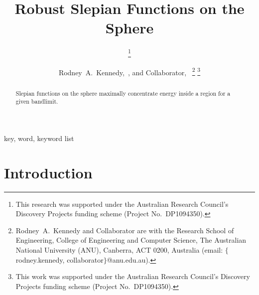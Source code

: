 \documentclass[10pt, twocolumn, twoside]{IEEEtran}
\begin{document}
\title{Robust Slepian Functions on the Sphere}

\ifCLASSOPTIONconference
	\author{
			\thanks{This research was supported under the Australian Research Council's Discovery Projects
				funding scheme (Project No.~DP1094350).}
		 \and
		}
\else
	\author{Rodney~A.~Kennedy,~, and
		Collaborator,~
		\thanks{Rodney~A.~Kennedy and Collaborator are with the Research School of Engineering,
			College of Engineering and Computer Science,
			The Australian National University (ANU), Canberra, ACT 0200, Australia
			(email: $\{$rodney.kennedy, collaborator$\}$@anu.edu.au).}
		\thanks{This work was supported under the Australian Research Council's Discovery Projects
			funding scheme (Project No.~DP1094350).}}
\fi


\maketitle


\begin{abstract}
Slepian functions on the sphere maximally concentrate energy inside a region for a given bandlimit.
\end{abstract}

\smallskip
\begin{IEEEkeywords}
key, word, keyword list
\end{IEEEkeywords}

\IEEEpeerreviewmaketitle

\section{Introduction}
\end{document}
